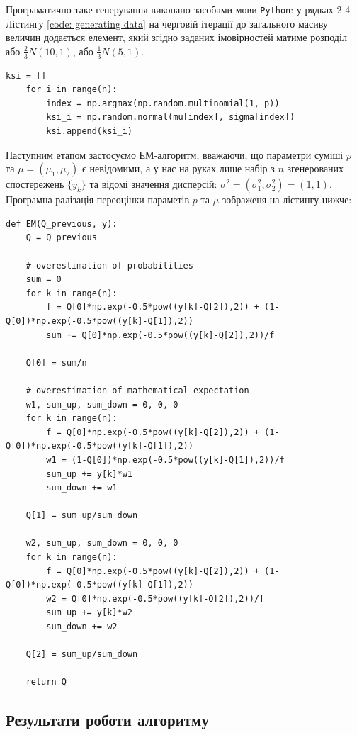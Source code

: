 \documentclass[a4paper,14pt]{extarticle} %
\numberwithin{equation}{section}
\begin{document}
Програматично таке генерування виконано засобами мови \texttt{Python}: у рядках 2-4 Лістингу \ref{code: generating data} на черговій ітерації до загального масиву величин додається елемент, який згідно заданих імовірностей матиме розподіл або $\tfrac{2}{3}N(10,1)$, або $\tfrac{1}{3}N(5,1)$.

\begin{lstlisting}[firstnumber=1, label = code: generating data, caption = Генерування даних]
    ksi = []
    for i in range(n):
        index = np.argmax(np.random.multinomial(1, p))
        ksi_i = np.random.normal(mu[index], sigma[index])
        ksi.append(ksi_i)
\end{lstlisting}

\vspace{0.4cm}
Наступним етапом застосуємо ЕМ-алгоритм, вважаючи, що параметри суміші $p$ та $\mu=(\mu_1, \mu_2)$ є невідомими, а у нас на руках лише набір з $n$ згенерованих спостережень $\{y_k\}$ та відомі значення дисперсій: $\sigma^2=(\sigma^2_1, \sigma^2_2)=(1, 1)$. Програмна ралізація переоцінки параметів $p$ та $\mu$ зображеня на лістингу нижче:  

\begin{lstlisting}[firstnumber=1, label = code: EM3, caption = Функція EM-алгоритму]
    def EM(Q_previous, y):
    Q = Q_previous

    # overestimation of probabilities
    sum = 0
    for k in range(n):
        f = Q[0]*np.exp(-0.5*pow((y[k]-Q[2]),2)) + (1-Q[0])*np.exp(-0.5*pow((y[k]-Q[1]),2))
        sum += Q[0]*np.exp(-0.5*pow((y[k]-Q[2]),2))/f

    Q[0] = sum/n

    # overestimation of mathematical expectation
    w1, sum_up, sum_down = 0, 0, 0
    for k in range(n):
        f = Q[0]*np.exp(-0.5*pow((y[k]-Q[2]),2)) + (1-Q[0])*np.exp(-0.5*pow((y[k]-Q[1]),2))
        w1 = (1-Q[0])*np.exp(-0.5*pow((y[k]-Q[1]),2))/f
        sum_up += y[k]*w1
        sum_down += w1

    Q[1] = sum_up/sum_down

    w2, sum_up, sum_down = 0, 0, 0
    for k in range(n):
        f = Q[0]*np.exp(-0.5*pow((y[k]-Q[2]),2)) + (1-Q[0])*np.exp(-0.5*pow((y[k]-Q[1]),2))
        w2 = Q[0]*np.exp(-0.5*pow((y[k]-Q[2]),2))/f
        sum_up += y[k]*w2
        sum_down += w2

    Q[2] = sum_up/sum_down

    return Q
\end{lstlisting}

\subsection*{Результати роботи алгоритму}
\end{document}
